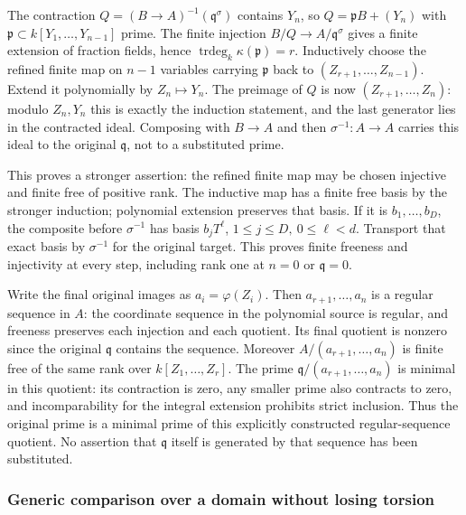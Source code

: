 The contraction \(Q=(B\to A)^{-1}(\mathfrak q^\sigma)\) contains \(Y_n\), so \(Q=\mathfrak pB+(Y_n)\) with \(\mathfrak p\subset k[Y_1,\ldots,Y_{n-1}]\) prime. The finite injection \(B/Q\to A/\mathfrak q^\sigma\) gives a finite extension of fraction fields, hence \(\operatorname{trdeg}_k\kappa(\mathfrak p)=r\). Inductively choose the refined finite map on \(n-1\) variables carrying \(\mathfrak p\) back to \((Z_{r+1},\ldots,Z_{n-1})\). Extend it polynomially by \(Z_n\mapsto Y_n\). The preimage of \(Q\) is now \((Z_{r+1},\ldots,Z_n)\): modulo \(Z_n,Y_n\) this is exactly the induction statement, and the last generator lies in the contracted ideal. Composing with \(B\to A\) and then \(\sigma^{-1}:A\to A\) carries this ideal to the original \(\mathfrak q\), not to a substituted prime.

This proves a stronger assertion: the refined finite map may be chosen injective and finite free of positive rank. The inductive map has a finite free basis by the stronger induction; polynomial extension preserves that basis. If it is \(b_1,\ldots,b_D\), the composite before \(\sigma^{-1}\) has basis \(b_jT^\ell\), \(1\leq j\leq D,\ 0\leq\ell<d\). Transport that exact basis by \(\sigma^{-1}\) for the original target. This proves finite freeness and injectivity at every step, including rank one at \(n=0\) or \(\mathfrak q=0\).

Write the final original images as \(a_i=\varphi(Z_i)\). Then \(a_{r+1},\ldots,a_n\) is a regular sequence in \(A\): the coordinate sequence in the polynomial source is regular, and freeness preserves each injection and each quotient. Its final quotient is nonzero since the original \(\mathfrak q\) contains the sequence. Moreover \(A/(a_{r+1},\ldots,a_n)\) is finite free of the same rank over \(k[Z_1,\ldots,Z_r]\). The prime \(\mathfrak q/(a_{r+1},\ldots,a_n)\) is minimal in this quotient: its contraction is zero, any smaller prime also contracts to zero, and incomparability for the integral extension prohibits strict inclusion. Thus the original prime is a minimal prime of this explicitly constructed regular-sequence quotient. No assertion that \(\mathfrak q\) itself is generated by that sequence has been substituted.

\subsubsection{Generic comparison over a domain without losing torsion}\label{generic-comparison-over-a-domain-without-losing-torsion}

